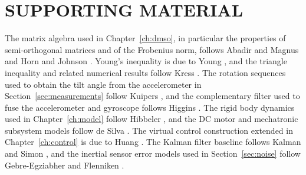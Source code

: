 \section{SUPPORTING MATERIAL}

The matrix algebra used in Chapter~\ref{ch:dmso}, in particular the properties of
semi-orthogonal matrices and of the Frobenius norm, follows Abadir and Magnus
\cite{abadir2005matrix} and Horn and Johnson \cite{horn2013matrix}. Young's
inequality is due to Young \cite{young1912classes}, and the triangle inequality
and related numerical results follow Kress \cite{kress1998numerical}. The
rotation sequences used to obtain the tilt angle from the accelerometer in
Section~\ref{sec:measurements} follow Kuipers \cite{kuipers1999quaternions}, and
the complementary filter used to fuse the accelerometer and gyroscope follows
Higgins \cite{higgins1975comparison}. The rigid body dynamics used in
Chapter~\ref{ch:model} follow Hibbeler \cite{hibbeler2010dynamics}, and the DC
motor and mechatronic subsystem models follow de Silva
\cite{desilva2004mechatronics}. The virtual control construction extended in
Chapter~\ref{ch:control} is due to Huang \cite{huang2002lyapunov}. The Kalman
filter baseline follows Kalman \cite{kalman1960} and Simon
\cite{simon2006optimal}, and the inertial sensor error models used in
Section~\ref{sec:noise} follow Gebre-Egziabher \cite{gebreegziabher2004design}
and Flenniken \cite{flenniken2005modeling}.
